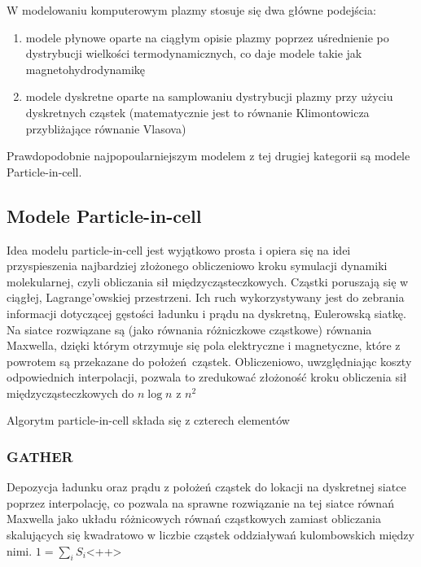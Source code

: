     W modelowaniu komputerowym plazmy stosuje się dwa główne podejścia:
    \begin{enumerate}
        \item modele płynowe oparte na ciągłym opisie plazmy poprzez uśrednienie po dystrybucji
            wielkości termodynamicznych, co daje modele takie jak magnetohydrodynamikę %
        \item modele dyskretne oparte na samplowaniu dystrybucji plazmy przy użyciu dyskretnych cząstek
            (matematycznie jest to równanie Klimontowicza przybliżające równanie Vlasova) %
    \end{enumerate}

    Prawdopodobnie najpopoularniejszym modelem z tej drugiej kategorii są modele Particle-in-cell.

    \subsection{Modele Particle-in-cell}

    Idea modelu particle-in-cell jest wyjątkowo prosta i opiera się na idei przyspieszenia najbardziej złożonego obliczeniowo kroku
    symulacji dynamiki molekularnej, czyli obliczania sił międzycząsteczkowych. Cząstki poruszają się w ciągłej, Lagrange'owskiej przestrzeni.
    Ich ruch wykorzystywany jest do zebrania informacji dotyczącej gęstości ładunku i prądu na dyskretną, Eulerowską siatkę. Na siatce rozwiązane
    są (jako równania różniczkowe cząstkowe) równania Maxwella, dzięki którym otrzymuje się pola elektryczne i magnetyczne, które z powrotem są przekazane
    do położeń cząstek. Obliczeniowo, uwzględniając koszty odpowiednich interpolacji, pozwala to zredukować złożoność kroku obliczenia sił międzycząsteczkowych
    do $n \log{n}$ z $n^2$ %

    Algorytm particle-in-cell składa się z czterech elementów %
    \subsubsection{GATHER}
    Depozycja ładunku oraz prądu z położeń cząstek do lokacji na dyskretnej siatce poprzez interpolację,
    co pozwala na sprawne rozwiązanie na tej siatce
    równań Maxwella jako układu różnicowych równań cząstkowych zamiast obliczania skalujących się kwadratowo w liczbie cząstek
    oddziaływań kulombowskich między nimi.
    $1 = \sum_i S_i$<++> %

